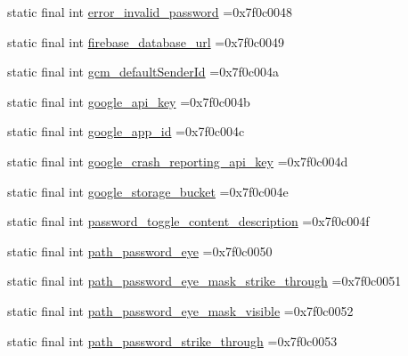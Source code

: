 \begin{DoxyCompactItemize}
\item 
static final int \mbox{\hyperlink{classbr_1_1unb_1_1cic_1_1mp_1_1marketmaster_1_1R_1_1string_a08d1ac723d2e0295c6e38494ea8fde87}{error\+\_\+invalid\+\_\+password}} =0x7f0c0048
\item 
static final int \mbox{\hyperlink{classbr_1_1unb_1_1cic_1_1mp_1_1marketmaster_1_1R_1_1string_a7f08907b33801c3f4db098e8f6a68fd4}{firebase\+\_\+database\+\_\+url}} =0x7f0c0049
\item 
static final int \mbox{\hyperlink{classbr_1_1unb_1_1cic_1_1mp_1_1marketmaster_1_1R_1_1string_a2d39c444b5cc48e63a22281696b2d9f3}{gcm\+\_\+default\+Sender\+Id}} =0x7f0c004a
\item 
static final int \mbox{\hyperlink{classbr_1_1unb_1_1cic_1_1mp_1_1marketmaster_1_1R_1_1string_af6630e556ad6d3eee2784c08f4930166}{google\+\_\+api\+\_\+key}} =0x7f0c004b
\item 
static final int \mbox{\hyperlink{classbr_1_1unb_1_1cic_1_1mp_1_1marketmaster_1_1R_1_1string_a944d7b202bb7ce2e12c2fa49a0cab885}{google\+\_\+app\+\_\+id}} =0x7f0c004c
\item 
static final int \mbox{\hyperlink{classbr_1_1unb_1_1cic_1_1mp_1_1marketmaster_1_1R_1_1string_a73028c85582d074ce1c0b659b6988c3d}{google\+\_\+crash\+\_\+reporting\+\_\+api\+\_\+key}} =0x7f0c004d
\item 
static final int \mbox{\hyperlink{classbr_1_1unb_1_1cic_1_1mp_1_1marketmaster_1_1R_1_1string_a24dfc36c19b6d26975aa6d83e1ec5598}{google\+\_\+storage\+\_\+bucket}} =0x7f0c004e
\item 
static final int \mbox{\hyperlink{classbr_1_1unb_1_1cic_1_1mp_1_1marketmaster_1_1R_1_1string_a451d5a14cabf61f68d0ae3f1b4e6214e}{password\+\_\+toggle\+\_\+content\+\_\+description}} =0x7f0c004f
\item 
static final int \mbox{\hyperlink{classbr_1_1unb_1_1cic_1_1mp_1_1marketmaster_1_1R_1_1string_aa44c1c6fd68259e165a3904423b7a442}{path\+\_\+password\+\_\+eye}} =0x7f0c0050
\item 
static final int \mbox{\hyperlink{classbr_1_1unb_1_1cic_1_1mp_1_1marketmaster_1_1R_1_1string_a4594149a76901441f0e1d4620fa82968}{path\+\_\+password\+\_\+eye\+\_\+mask\+\_\+strike\+\_\+through}} =0x7f0c0051
\item 
static final int \mbox{\hyperlink{classbr_1_1unb_1_1cic_1_1mp_1_1marketmaster_1_1R_1_1string_a46f207c8920686a745cd32ae5c0cef78}{path\+\_\+password\+\_\+eye\+\_\+mask\+\_\+visible}} =0x7f0c0052
\item 
static final int \mbox{\hyperlink{classbr_1_1unb_1_1cic_1_1mp_1_1marketmaster_1_1R_1_1string_aa8779a196a5cedb9df0265f175a6fd59}{path\+\_\+password\+\_\+strike\+\_\+through}} =0x7f0c0053

\end{DoxyCompactItemize}

